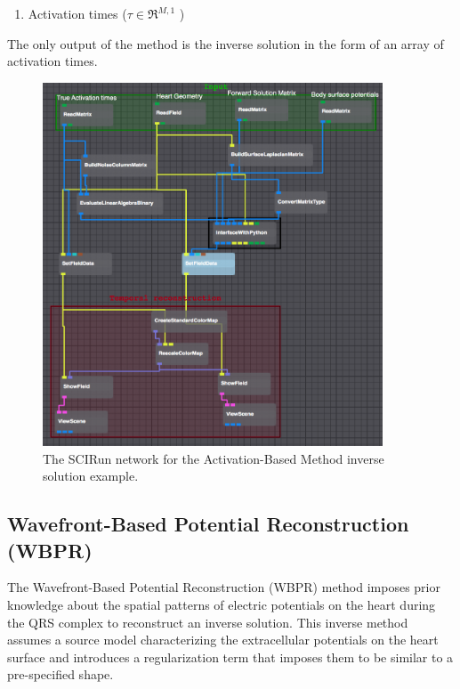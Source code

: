     \begin{enumerate}
        \item Activation times ($\tau\in\Re^{M,1}$ )
    \end{enumerate}
    The only output of the method is the inverse solution in the form of an array of activation times.

   \begin{figure}
       \begin{center}
       \includegraphics[width=0.9\textwidth]{ECGToolkitGuide_figures/activationBasedNetwork.png}
       \caption{The SCIRun network for the Activation-Based Method inverse solution example.}
       \label{fig:activationBasedNetwork}
       \end{center}
   \end{figure}


\subsection{Wavefront-Based Potential Reconstruction (WBPR)}

    The Wavefront-Based Potential Reconstruction (WBPR) method imposes prior knowledge about the spatial patterns of electric potentials on the heart during the QRS complex to reconstruct an inverse solution.
    This inverse method assumes a source model characterizing the extracellular potentials on the heart surface and introduces a regularization term that imposes them to be similar to a pre-specified shape.

